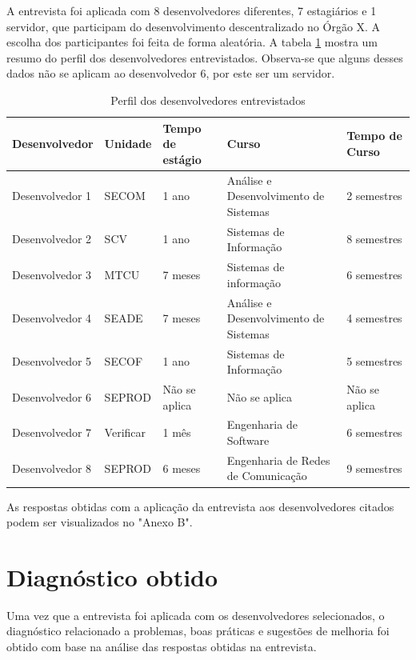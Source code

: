 A entrevista foi aplicada com 8 desenvolvedores diferentes, 7 estagiários e 1 servidor, que participam do desenvolvimento descentralizado no Órgão X. A escolha dos participantes foi feita de forma aleatória. A tabela \ref{tab02} mostra um resumo do perfil dos desenvolvedores entrevistados. Observa-se que alguns desses dados não se aplicam ao desenvolvedor 6, por este ser um servidor.\newline

\begin{table}[h]
	\centering
	\begin{tabular}{|m{2.88cm} | m{2.8cm} | m{2.2cm}| m{2.8cm} | m{2.2cm}|}
		\hline
		\textbf{Desenvolvedor} & \textbf{Unidade} & \textbf{Tempo de estágio} & 
		\textbf{Curso} & \textbf{Tempo de Curso} \\ \hline
		Desenvolvedor 1 & SECOM & 1 ano & Análise e Desenvolvimento de Sistemas & 2 semestres \\
		\hline
		Desenvolvedor 2 & SCV & 1 ano & Sistemas de Informação & 8 semestres \\
		\hline
		Desenvolvedor 3 & MTCU & 7 meses & Sistemas de informação & 6 semestres \\
		\hline
		Desenvolvedor 4 & SEADE & 7 meses & Análise e Desenvolvimento de Sistemas & 4 semestres \\
		\hline
		Desenvolvedor 5 & SECOF & 1 ano & Sistemas de Informação & 5 semestres \\
		\hline
		Desenvolvedor 6 & SEPROD & Não se aplica & Não se aplica & Não se aplica \\
		\hline
		Desenvolvedor 7 & Verificar & 1 mês & Engenharia de Software & 6 semestres \\
		\hline
		Desenvolvedor 8 & SEPROD & 6 meses & Engenharia de Redes de Comunicação & 9 semestres \\
		\hline
	\end{tabular}

	\caption{Perfil dos desenvolvedores entrevistados}
	\label{tab02}
\end{table}

As respostas obtidas com a aplicação da entrevista aos desenvolvedores citados podem ser visualizados no "Anexo B".


\section{Diagnóstico obtido}

Uma vez que a entrevista foi aplicada com os desenvolvedores selecionados, o diagnóstico relacionado a problemas, boas práticas e sugestões de melhoria foi obtido com base na análise das respostas obtidas na entrevista.

